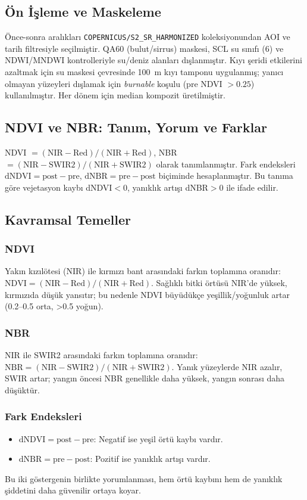 \documentclass[11pt,a4paper]{article}
\begin{document}
\subsection{Ön İşleme ve Maskeleme}
Önce-sonra aralıkları \texttt{COPERNICUS/S2\_SR\_HARMONIZED} koleksiyonundan AOI ve tarih filtresiyle seçilmiştir. QA60 (bulut/sirrus) maskesi, SCL su sınıfı (6) ve NDWI/MNDWI kontrolleriyle su/deniz alanları dışlanmıştır. Kıyı şeridi etkilerini azaltmak için su maskesi çevresinde \SI{100}{m} kıyı tamponu uygulanmış; yanıcı olmayan yüzeyleri dışlamak için \emph{burnable} koşulu (pre NDVI $>0.25$) kullanılmıştır. Her dönem için median kompozit üretilmiştir.
\subsection{NDVI ve NBR: Tanım, Yorum ve Farklar}
NDVI $=(\mathrm{NIR}-\mathrm{Red})/(\mathrm{NIR}+\mathrm{Red})$, NBR $=(\mathrm{NIR}-\mathrm{SWIR2})/(\mathrm{NIR}+\mathrm{SWIR2})$ olarak tanımlanmıştır. Fark endeksleri \(\mathrm{dNDVI}=\mathrm{post}-\mathrm{pre}\), \(\mathrm{dNBR}=\mathrm{pre}-\mathrm{post}\) biçiminde hesaplanmıştır. Bu tanıma göre vejetasyon kaybı dNDVI$<0$, yanıklık artışı dNBR$>0$ ile ifade edilir.

\subsection{Kavramsal Temeller}
\subsubsection{NDVI}
Yakın kızılötesi (NIR) ile kırmızı bant arasındaki farkın toplamına oranıdır:\,\(\mathrm{NDVI}=(\mathrm{NIR}-\mathrm{Red})/(\mathrm{NIR}+\mathrm{Red})\). Sağlıklı bitki örtüsü NIR'de yüksek, kırmızıda düşük yansıtır; bu nedenle NDVI büyüdükçe yeşillik/yoğunluk artar (0.2--0.5 orta, >0.5 yoğun).

\subsubsection{NBR}
NIR ile SWIR2 arasındaki farkın toplamına oranıdır:\,\(\mathrm{NBR}=(\mathrm{NIR}-\mathrm{SWIR2})/(\mathrm{NIR}+\mathrm{SWIR2})\). Yanık yüzeylerde NIR azalır, SWIR artar; yangın öncesi NBR genellikle daha yüksek, yangın sonrası daha düşüktür.

\subsubsection{Fark Endeksleri}
\begin{itemize}
  \item \(\mathrm{dNDVI}=\mathrm{post}-\mathrm{pre}\): Negatif ise yeşil örtü kaybı vardır.
  \item \(\mathrm{dNBR}=\mathrm{pre}-\mathrm{post}\): Pozitif ise yanıklık artışı vardır.
\end{itemize}
Bu iki göstergenin birlikte yorumlanması, hem örtü kaybını hem de yanıklık şiddetini daha güvenilir ortaya koyar.
\end{document}
